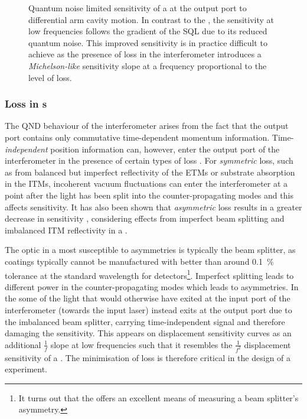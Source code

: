 \begin{figure}
  \centering
  
  \caption[Sensitivity of a \SSM{} at the output port to differential arm cavity motion]{\label{fig:ssm-sensitivity}Quantum noise limited sensitivity of a \SSM{} at the output port to differential arm cavity motion. In contrast to the \MI{}, the \SSM{} sensitivity at low frequencies follows the gradient of the \gls{SQL} due to its reduced quantum noise. This improved sensitivity is in practice difficult to achieve as the presence of loss in the interferometer introduces a \emph{Michelson-like} sensitivity slope at a frequency proportional to the level of loss.}
\end{figure}

\subsubsection{Loss in \SSM{}s}
The \gls{QND} behaviour of the interferometer arises from the fact that the output port contains only commutative time-dependent momentum information. Time-\emph{independent} position information can, however, enter the output port of the interferometer in the presence of certain types of loss \cite{Danilishin2004}. For \emph{symmetric} loss, such as from balanced but imperfect reflectivity of the \glspl{ETM} or substrate absorption in the \glspl{ITM}, incoherent vacuum fluctuations can enter the interferometer at a point after the light has been split into the counter-propagating modes and this affects sensitivity. It has also been shown that \emph{asymmetric} loss results in a greater decrease in sensitivity \cite{Danilishin2015}, considering effects from imperfect beam splitting and imbalanced \gls{ITM} reflectivity in a \SSM{}.

The optic in a \SSM{} most susceptible to asymmetries is typically the beam splitter, as coatings typically cannot be manufactured with better than around \SI{0.1}{\percent} tolerance at the standard wavelength for detectors\footnote{It turns out that the \SSM{} offers an excellent means of measuring a beam splitter's asymmetry.}. Imperfect splitting leads to different power in the counter-propagating modes which leads to asymmetries. In the \SSM{} some of the light that would otherwise have exited at the input port of the interferometer (towards the input laser) instead exits at the output port due to the imbalanced beam splitter, carrying time-independent signal and therefore damaging the sensitivity. This appears on displacement sensitivity curves as an additional $\frac{1}{f}$ slope at low frequencies such that it resembles the $\frac{1}{f^2}$ displacement sensitivity of a \MI{}. The minimisation of loss is therefore critical in the design of a \SSM{} experiment.

